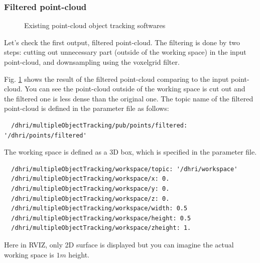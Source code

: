 \documentclass[a4paper,twoside, openright,12pt]{report}
\begin{document}
\subsubsection{Filtered point-cloud}

\begin{figure}[b]
	\centering
	\hfil
	\caption{Existing point-cloud object tracking softwares}
	\label{fig:pmot_filtered}
\end{figure}
Let's check the first output, filtered point-cloud. The filtering is done by two steps: cutting out unnecessary part (outside of the working space) in the input point-cloud, and downsampling using the voxelgrid filter.

Fig. \ref{fig:pmot_filtered} shows the result of the filtered point-cloud comparing to the input point-cloud. You can see the point-cloud outside of the working space is cut out and the filtered one is less dense than the original one. 
The topic name of the filtered point-cloud is defined in the parameter file as follows: 
\begin{verbatim}
  /dhri/multipleObjectTracking/pub/points/filtered: '/dhri/points/filtered'
\end{verbatim}

The working space is defined as a 3D box, which is specified in the parameter file. 
\begin{verbatim}
  /dhri/multipleObjectTracking/workspace/topic: '/dhri/workspace'
  /dhri/multipleObjectTracking/workspace/x: 0.
  /dhri/multipleObjectTracking/workspace/y: 0.
  /dhri/multipleObjectTracking/workspace/z: 0.
  /dhri/multipleObjectTracking/workspace/width: 0.5
  /dhri/multipleObjectTracking/workspace/height: 0.5
  /dhri/multipleObjectTracking/workspace/zheight: 1.
\end{verbatim}
Here in RVIZ, only 2D surface is displayed but you can imagine the actual working space is $1m$ height.
\end{document}
